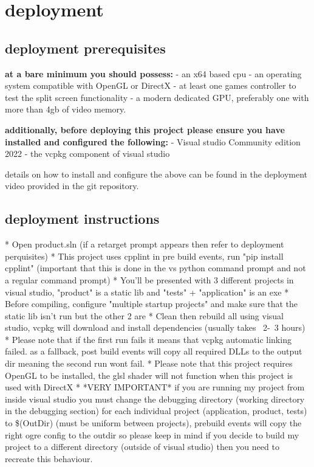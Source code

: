 \documentclass[]{final_report}
\begin{document}
\chapter {deployment}

\section {deployment prerequisites}
 
\textbf{at a bare minimum you should possess:} \newline
- an x64 based cpu 
- an operating system compatible with OpenGL or DirectX
- at least one games controller to test the split screen functionality
- a modern dedicated GPU, preferably one with more than 4gb of video memory.
 
\textbf{additionally, before deploying this project please ensure you have installed and configured the following:} \newline
-  Visual studio Community edition 2022
-  the vcpkg component of visual studio 


details on how to install and configure the above can be found in the deployment video provided in the git repository.
\section{deployment instructions}

* Open product.sln (if a retarget prompt appears then refer to deployment perquisites) \newline
* This project uses cpplint in pre build events, run "pip install cpplint" (important that this is done in the vs python command prompt and not a regular command prompt) \newline
* You'll be presented with 3 different projects in visual studio, "product" is a static lib and "tests" + "application" is an exe \newline
* Before compiling, configure "multiple startup projects" and make sure that the static lib isn't run but the other 2 are \newline
* Clean then rebuild all using visual studio, vcpkg will download and install dependencies (usually takes ~2-~3 hours) \newline
* Please note that if the first run fails it means that vcpkg automatic linking failed. as a fallback, post build events will copy all required DLLs to the output dir meaning the second run wont fail. \newline
* Please note that this project requires OpenGL to be installed, the glsl shader will not function when this project is used with DirectX
* *VERY IMPORTANT* if you are running my project from inside visual studio you must change the debugging directory (working directory in the debugging section) for each individual project (application, product, tests)  to \$(OutDir) (must be uniform between projects), prebuild events will copy the right ogre config to the outdir so please keep in mind if you decide to build my project to a different directory (outside of visual studio) then you need to recreate this behaviour.\newline
\end{document}
